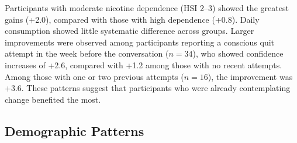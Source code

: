Participants with moderate nicotine dependence (HSI 2--3) showed the greatest gains (+2.0), compared with those with high dependence (+0.8). Daily consumption showed little systematic difference across groups. Larger improvements were observed among participants reporting a conscious quit attempt in the week before the conversation ($n = 34$), who showed confidence increases of +2.6, compared with +1.2 among those with no recent attempts. Among those with one or two previous attempts ($n = 16$), the improvement was +3.6. These patterns suggest that participants who were already contemplating change benefited the most.

\subsection*{Demographic Patterns}

